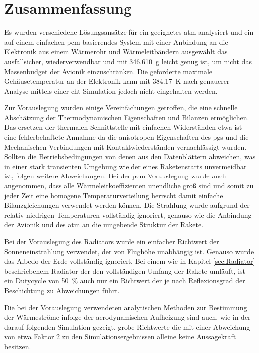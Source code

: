 \chapter{Zusammenfassung}
\label{chap:Zusammenfassung}

Es wurden verschiedene Lösungsansätze für ein geeignetes \ac{atm} analysiert und ein auf einem einfachen \ac{pcm} basierendes System
mit einer Anbindung an die Elektronik aus einem Wärmerohr und Wärmeleitbändern
ausgewählt das ausfallsicher, wiederverwendbar und mit \SI{346,610}{\gram} leicht genug ist, um nicht das Massenbudget der Avionik einzuschränken.
Die geforderte maximale Gehäusetemperatur an der Elektronik kann mit \SI{384,17}{\kelvin} nach genauerer Analyse mittels einer \ac{cht} Simulation
jedoch nicht eingehalten werden.

Zur Vorauslegung wurden einige Vereinfachungen getroffen, die eine schnelle Abschätzung der Thermodynamischen Eigenschaften
und Bilanzen ermöglichen.
Das ersetzen der thermalen Schnittstelle mit einfachen Widerständen etwa ist eine fehlerbehaftete Annahme da die anisotropen Eigenschaften des \ac{pgs} und
die Mechanischen
Verbindungen mit Kontaktwiederständen vernachlässigt wurden. Sollten die Betriebsbedingungen von denen aus den Datenblättern abweichen, was in einer
stark transienten Umgebung wie der eines Raketenstarts unvermeidbar ist, folgen weitere Abweichungen.
Bei der \ac{pcm} Vorauslegung wurde auch angenommen, dass alle Wärmeleitkoeffizienten unendliche groß sind und somit zu jeder Zeit
eine homogene Temperaturverteilung herrscht damit einfache Bilanzgleichungen verwendet werden können.
Die Strahlung wurde aufgrund der relativ niedrigen Temperaturen vollständig ignoriert, genauso wie
die Anbindung der Avionik und des \ac{atm} an die umgebende Struktur der Rakete.

Bei der Vorauslegung des Radiators wurde ein einfacher Richtwert der Sonneneinstrahlung verwendet, der von Flughöhe unabhängig ist.
Genauso wurde das Albedo der Erde vollständig ignoriert.
Bei einem wie in Kapitel \ref{sec:Radiator} beschriebenem Radiator der den vollständigen Umfang der Rakete umläuft, ist ein Dutycycle von
\SI{50}{\percent} auch nur ein Richtwert der je nach Reflexionsgrad der Beschichtung zu Abweichungen führt.

Die bei der Vorauslegung verwendeten analytischen Methoden zur Bestimmung der Wärmeströme infolge der aerodynamischen Aufheizung sind auch,
wie in der darauf folgenden Simulation gezeigt, grobe Richtwerte die mit einer Abweichung von etwa Faktor 2 zu den Simulationsergebnissen
alleine keine Aussagekraft besitzen.

